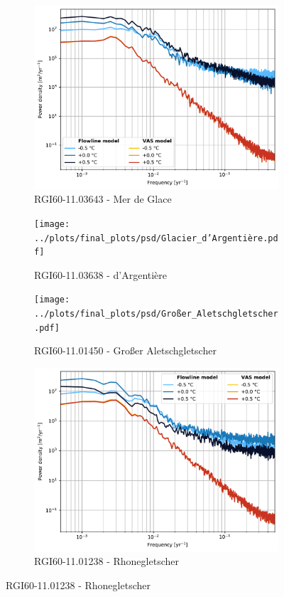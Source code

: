 \begin{figure}[htp]
        \begin{subfigure}[b]{0.48\textwidth}
          \caption{RGI60-11.03643 - Mer de Glace}
          \label{fig:psd:mer_de_glace}
          \centering
          \includegraphics[width=\textwidth]{../plots/final_plots/psd/Mer_de_Glace.pdf}
        \end{subfigure}
        \hfill
        \begin{subfigure}[b]{0.48\textwidth}
          \caption{RGI60-11.03638 - d'Argentière}
          \label{fig:psd:glacier_d_argentiere}
          \centering
          \texttt{[image: ../plots/final\_plots/psd/Glacier\_d'Argentière.pdf]}
        \end{subfigure}
        \begin{subfigure}[b]{0.48\textwidth}
          \caption{RGI60-11.01450 - Großer Aletschgletscher}
          \label{fig:psd:großer_aletschgletscher}
          \centering
          \texttt{[image: ../plots/final\_plots/psd/Großer\_Aletschgletscher.pdf]}
        \end{subfigure}
        \hfill
        \begin{subfigure}[b]{0.48\textwidth}
          \caption{RGI60-11.01238 - Rhonegletscher}
          \label{fig:psd:rhonegletscher}
          \centering
          \includegraphics[width=\textwidth]{../plots/final_plots/psd/Rhonegletscher.pdf}

\end{subfigure}
\end{figure}
